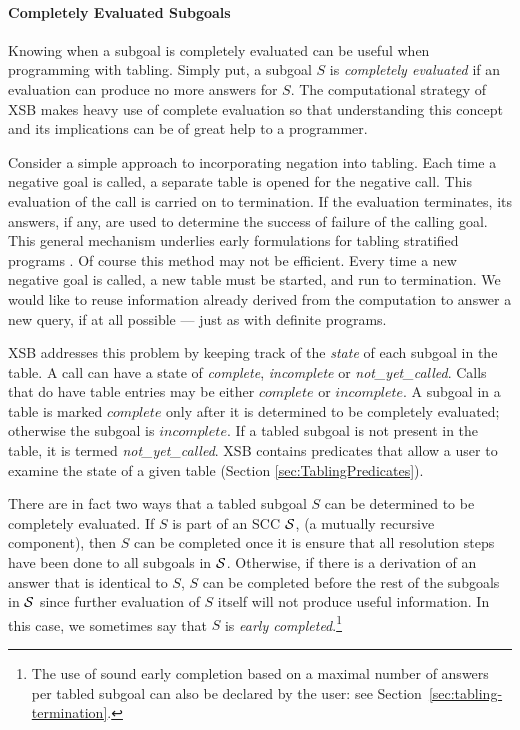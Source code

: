 \paragraph*{Completely Evaluated Subgoals}

Knowing when a subgoal is completely evaluated can be useful when
programming with tabling.  Simply put, a subgoal $S$ is {\em
  completely evaluated} if an evaluation can produce no more answers
for $S$\@.  The computational strategy of XSB makes heavy use of
complete evaluation so that understanding this concept and its
implications can be of great help to a programmer.

Consider a simple approach to incorporating negation into tabling.
Each time a negative goal is called, a separate table is opened for
the negative call.  This evaluation of the call is carried on to
termination.  If the evaluation terminates, its answers, if any, are
used to determine the success of failure of the calling goal.  This
general mechanism underlies early formulations for tabling stratified
programs \cite{KeTo88,Seki89}.  Of course this method may not be
efficient.  Every time a new negative goal is called, a new table must
be started, and run to termination.  We would like to reuse information
already derived from the computation to answer a new query, if at all
possible --- just as with definite programs.

XSB addresses this problem by keeping track of the {\em state} of each
subgoal in the table.  A call can have a state of {\em complete}, {\em
incomplete} or {\em not\_yet\_called}.  
Calls that do have table entries may be either $complete$ or
$incomplete$.  A subgoal in a table is marked $complete$ only after it
is determined to be completely evaluated; otherwise the subgoal is
$incomplete$.  If a tabled subgoal is not present in the table, it is
termed {\em not\_yet\_called}.  XSB contains predicates that allow a
user to examine the state of a given table (Section
\ref{sec:TablingPredicates}).

 There are in fact two
ways that a tabled subgoal $S$ can be determined to be completely
evaluated.  If $S$ is part of an SCC ${\cal S}$, (a mutually recursive
component), then $S$ can be completed once it is ensure that all
resolution steps have been done to all subgoals in ${\cal S}$.  Otherwise,
if there is a derivation of an answer that is identical to $S$, $S$
can be completed before the rest of the subgoals in ${\cal S}$ since
further evaluation of $S$ itself will not produce useful information.
In this case, we sometimes say that $S$ is {\em early
  completed}.\footnote{The use of sound early completion based on a
  maximal number of answers per tabled subgoal can also be declared by
  the user: see Section~\ref{sec:tabling-termination}.}


